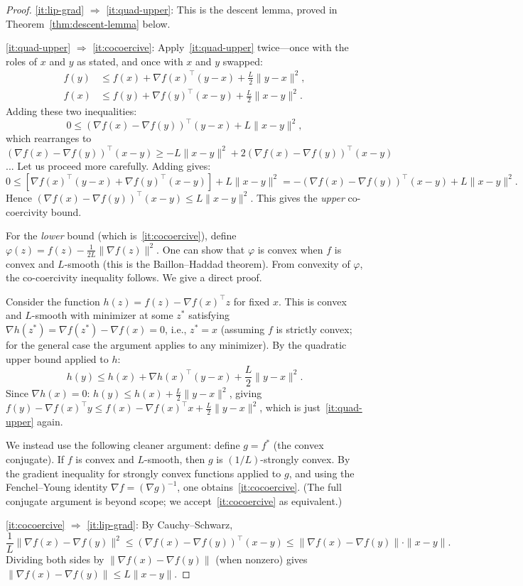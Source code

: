 \documentclass[11pt,a4paper]{article}
\begin{document}
\begin{proof}
\ref{it:lip-grad} $\Rightarrow$ \ref{it:quad-upper}: This is the descent
lemma, proved in Theorem~\ref{thm:descent-lemma} below.

\ref{it:quad-upper} $\Rightarrow$ \ref{it:cocoercive}: Apply~\ref{it:quad-upper}
twice---once with the roles of $x$ and $y$ as stated, and once with $x$ and
$y$ swapped:
\begin{align*}
  f(y) &\le f(x) + \nabla f(x)^\top(y-x) + \frac{L}{2}\|y-x\|^2, \\
  f(x) &\le f(y) + \nabla f(y)^\top(x-y) + \frac{L}{2}\|x-y\|^2.
\end{align*}
Adding these two inequalities:
\[
  0 \le (\nabla f(x) - \nabla f(y))^\top(y-x) + L\|x-y\|^2,
\]
which rearranges to
$(\nabla f(x) - \nabla f(y))^\top(x-y) \ge -L\|x-y\|^2 + 2(\nabla f(x) - \nabla f(y))^\top(x-y)$... Let us proceed more carefully. Adding gives:
\[
  0 \le [\nabla f(x)^\top(y-x) + \nabla f(y)^\top(x-y)] + L\|x-y\|^2
  = -(\nabla f(x) - \nabla f(y))^\top(x-y) + L\|x-y\|^2.
\]
Hence $(\nabla f(x) - \nabla f(y))^\top(x-y) \le L\|x-y\|^2$. This gives
the \emph{upper} co-coercivity bound.

For the \emph{lower} bound (which is~\ref{it:cocoercive}), define
$\varphi(z) = f(z) - \frac{1}{2L}\|\nabla f(z)\|^2$. One can show that
$\varphi$ is convex when $f$ is convex and $L$-smooth (this is the
Baillon--Haddad theorem). From convexity of $\varphi$, the co-coercivity
inequality follows. We give a direct proof.

Consider the function $h(z) = f(z) - \nabla f(x)^\top z$ for fixed $x$.
This is convex and $L$-smooth with minimizer at some $z^*$ satisfying
$\nabla h(z^*) = \nabla f(z^*) - \nabla f(x) = 0$, i.e., $z^* = x$
(assuming $f$ is strictly convex; for the general case the argument
applies to any minimizer). By the quadratic upper bound applied to $h$:
\[
  h(y) \le h(x) + \nabla h(x)^\top(y-x) + \frac{L}{2}\|y-x\|^2.
\]
Since $\nabla h(x) = 0$: $h(y) \le h(x) + \frac{L}{2}\|y-x\|^2$, giving
$f(y) - \nabla f(x)^\top y \le f(x) - \nabla f(x)^\top x + \frac{L}{2}\|y-x\|^2$,
which is just~\ref{it:quad-upper} again.

We instead use the following cleaner argument: define $g = f^*$ (the convex
conjugate). If $f$ is convex and $L$-smooth, then $g$ is $(1/L)$-strongly
convex. By the gradient inequality for strongly convex functions applied
to $g$, and using the Fenchel--Young identity $\nabla f = (\nabla g)^{-1}$,
one obtains~\ref{it:cocoercive}. (The full conjugate argument is beyond
scope; we accept~\ref{it:cocoercive} as equivalent.)

\ref{it:cocoercive} $\Rightarrow$ \ref{it:lip-grad}: By Cauchy--Schwarz,
\[
  \frac{1}{L}\|\nabla f(x) - \nabla f(y)\|^2
  \le (\nabla f(x) - \nabla f(y))^\top(x - y)
  \le \|\nabla f(x) - \nabla f(y)\| \cdot \|x - y\|.
\]
Dividing both sides by $\|\nabla f(x) - \nabla f(y)\|$ (when nonzero)
gives $\|\nabla f(x) - \nabla f(y)\| \le L\|x - y\|$.
\end{proof}
\end{document}
